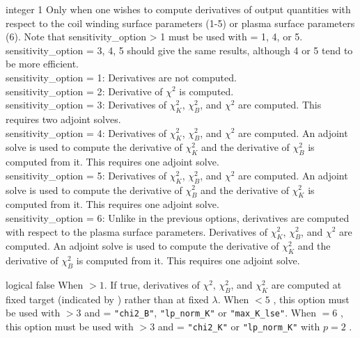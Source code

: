 {integer}
{1}
{Only when one wishes to compute derivatives of output quantities with respect to the coil winding surface parameters (1-5) or plasma surface parameters (6). Note that {\ttfamily sensitivity\_option > 1} must be used with  = 1, 4, or 5. {\ttfamily sensitivity\_option = 3, 4, 5} should give the same results, although 4 or 5 tend to be more efficient. }
{\\
{\ttfamily sensitivity\_option = 1}: Derivatives are not computed. \\
{\ttfamily sensitivity\_option = 2}: Derivative of $\chi^2$ is computed. \\
{\ttfamily sensitivity\_option = 3}: Derivatives of $\chi^2_K$, $\chi^2_B$, and $\chi^2$ are computed. This requires two adjoint solves. \\
{\ttfamily sensitivity\_option = 4}: Derivatives of $\chi^2_K$, $\chi^2_B$, and $\chi^2$ are computed. An adjoint solve is used to compute the derivative of $\chi^2_K$ and the derivative of $\chi^2_B$ is computed from it. This requires one adjoint solve. \\
{\ttfamily sensitivity\_option = 5}: Derivatives of $\chi^2_K$, $\chi^2_B$, and $\chi^2$ are computed. An adjoint solve is used to compute the derivative of $\chi^2_B$ and the derivative of $\chi^2_K$ is computed from it. This requires one adjoint solve. \\
{\ttfamily sensitivity\_option = 6}: Unlike in the previous options, derivatives are computed with respect to the plasma surface parameters. Derivatives of $\chi^2_K$, $\chi^2_B$, and $\chi^2$ are computed. An adjoint solve is used to compute the derivative of $\chi^2_K$ and the derivative of $\chi^2_B$ is computed from it. This requires one adjoint solve. 
}

\myhrule

{logical}
{false}
{When  $> 1$.}
{If true, derivatives of $\chi^2$, $\chi^2_B$, and $\chi^2_K$ are computed at fixed target (indicated by ) rather than at fixed $\lambda$. When  $< 5$ , this option must be used with  $> 3$ and  = \texttt{"chi2\_B"}, \texttt{"lp\_norm\_K"} or \texttt{"max\_K\_lse"}. When  $=6$ , this option must be used with  $> 3$ and  = \texttt{"chi2\_K"} or \texttt{"lp\_norm\_K"}  with $p=2$ .}

